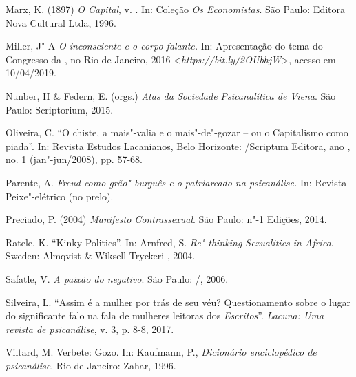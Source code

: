 Marx, K. (1897) \emph{O Capital}, v. . In: Coleção \emph{Os
Economistas}. São Paulo: Editora Nova Cultural Ltda, 1996.

Miller, J"-A \emph{O inconsciente e o corpo falante.} In: Apresentação do
tema do  Congresso da , no Rio de Janeiro, 2016
\textless{}\emph{https://bit.ly/2OUbhjW}\textgreater{}, acesso em 10/04/2019.

Nunber, H \& Federn, E. (orgs.) \emph{Atas da Sociedade Psicanalítica de
Viena}. São Paulo: Scriptorium, 2015.

Oliveira, C. ``O chiste, a mais"-valia e o mais"-de"-gozar -- ou o
Capitalismo como piada''. In: Revista Estudos Lacanianos, Belo
Horizonte: /Scriptum Editora, ano , no. 1 (jan"-jun/2008), pp.
57-68.

Parente, A. \emph{Freud como grão"-burguês e o patriarcado na
psicanálise.} In: Revista Peixe"-elétrico (no prelo).

Preciado, P. (2004) \emph{Manifesto Contrassexual}. São Paulo: n"-1
Edições, 2014.

Ratele, K. ``Kinky Politics''. In: Arnfred, S. \emph{Re"-thinking
Sexualities in Africa}. Sweden: Almqvist \& Wiksell Tryckeri , 2004.

Safatle, V. \emph{A paixão do negativo}. São Paulo: /, 2006.

Silveira, L. ``Assim é a mulher por trás de seu véu? Questionamento
sobre o lugar do significante falo na fala de mulheres leitoras dos
\emph{Escritos}''. \emph{Lacuna: Uma revista de psicanálise}, v. 3, p.
8-8, 2017.

Viltard, M. Verbete: Gozo. In: Kaufmann, P., \emph{Dicionário
enciclopédico de psicanálise}. Rio de Janeiro: Zahar, 1996.

